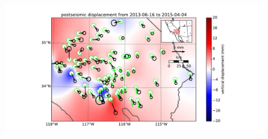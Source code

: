 \documentclass[12pt]{article}
\begin{document}
\begin{figure}
\includegraphics[scale=0.6,resolution=10]{Figures/far_field_data_4}
\centering 
\caption{}
\label{farfield4}
\end{figure}
\end{document}
